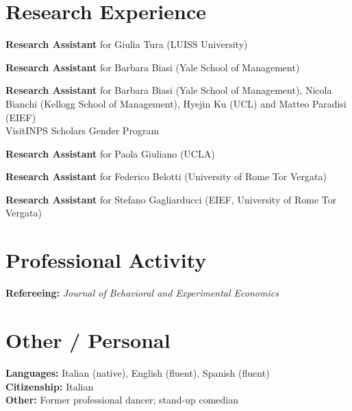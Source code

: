 \documentclass[11pt,a4paper]{article}
\newenvironment{cvlist}[1][3.0cm]{%
  \begin{list}{}{%
    \setlength{\leftmargin}{#1}%
    \setlength{\labelwidth}{\dimexpr#1-0.4cm\relax}%
    \setlength{\labelsep}{0.4cm}%
    \setlength{\itemsep}{5pt}%
    \setlength{\parsep}{0pt}%
    \setlength{\topsep}{3pt}%
    \renewcommand{\makelabel}[1]{##1\hfil}}}
  {\end{list}}
\newcommand{\when}[1]{\item[#1]}
\begin{document}
\section{Research Experience}
\begin{cvlist}
  \when{2025 -- 2026}
    \textbf{Research Assistant} for Giulia Tura (LUISS University)

  \when{2025}
    \textbf{Research Assistant} for Barbara Biasi (Yale School of Management)

  \when{2023 -- 2025}
    \textbf{Research Assistant} for Barbara Biasi (Yale School of Management),
    Nicola Bianchi (Kellogg School of Management), Hyejin Ku (UCL) and
    Matteo Paradisi (EIEF)\\
    {\small VisitINPS Scholars Gender Program}

  \when{2023}
    \textbf{Research Assistant} for Paola Giuliano (UCLA)

  \when{2022}
    \textbf{Research Assistant} for Federico Belotti
    (University of Rome Tor Vergata)

  \when{2021 -- 2022}
    \textbf{Research Assistant} for Stefano Gagliarducci
    (EIEF, University of Rome Tor Vergata)
\end{cvlist}

\section{Professional Activity}
\noindent
\textbf{Refereeing:} \textit{Journal of Behavioral and Experimental Economics}

\section{Other / Personal}
\noindent
\textbf{Languages:} Italian (native), English (fluent), Spanish (fluent)\\
\textbf{Citizenship:} Italian\\
\textbf{Other:} Former professional dancer; stand-up comedian

\end{document}
